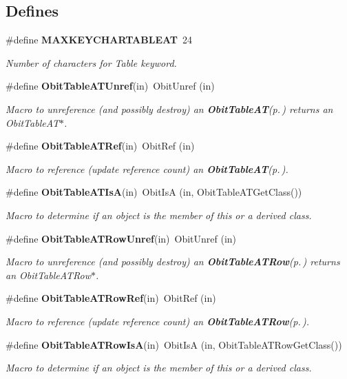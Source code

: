 \subsection*{Defines}
\begin{CompactItemize}
\item 
\#define {\bf MAXKEYCHARTABLEAT}\ 24
\begin{CompactList}\small\item\em Number of characters for Table keyword. \item\end{CompactList}\item 
\#define {\bf Obit\-Table\-ATUnref}(in)\ Obit\-Unref (in)
\begin{CompactList}\small\item\em Macro to unreference (and possibly destroy) an {\bf Obit\-Table\-AT}{\rm (p.\,\pageref{structObitTableAT})} returns an Obit\-Table\-AT$\ast$. \item\end{CompactList}\item 
\#define {\bf Obit\-Table\-ATRef}(in)\ Obit\-Ref (in)
\begin{CompactList}\small\item\em Macro to reference (update reference count) an {\bf Obit\-Table\-AT}{\rm (p.\,\pageref{structObitTableAT})}. \item\end{CompactList}\item 
\#define {\bf Obit\-Table\-ATIs\-A}(in)\ Obit\-Is\-A (in, Obit\-Table\-ATGet\-Class())
\begin{CompactList}\small\item\em Macro to determine if an object is the member of this or a derived class. \item\end{CompactList}\item 
\#define {\bf Obit\-Table\-ATRow\-Unref}(in)\ Obit\-Unref (in)
\begin{CompactList}\small\item\em Macro to unreference (and possibly destroy) an {\bf Obit\-Table\-ATRow}{\rm (p.\,\pageref{structObitTableATRow})} returns an Obit\-Table\-ATRow$\ast$. \item\end{CompactList}\item 
\#define {\bf Obit\-Table\-ATRow\-Ref}(in)\ Obit\-Ref (in)
\begin{CompactList}\small\item\em Macro to reference (update reference count) an {\bf Obit\-Table\-ATRow}{\rm (p.\,\pageref{structObitTableATRow})}. \item\end{CompactList}\item 
\#define {\bf Obit\-Table\-ATRow\-Is\-A}(in)\ Obit\-Is\-A (in, Obit\-Table\-ATRow\-Get\-Class())
\begin{CompactList}\small\item\em Macro to determine if an object is the member of this or a derived class. \item\end{CompactList}\end{CompactItemize}
